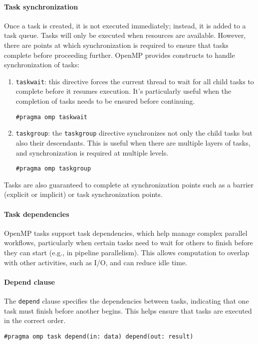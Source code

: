 \paragraph*{Task synchronization}
Once a task is created, it is not executed immediately; instead, it is added to a task queue. 
Tasks will only be executed when resources are available. However, there are points at which synchronization is required to ensure that tasks complete before proceeding further.
OpenMP provides constructs to handle synchronization of tasks:
\begin{enumerate}
    \item \texttt{taskwait}: this directive forces the current thread to wait for all child tasks to complete before it resumes execution. 
        It's particularly useful when the completion of tasks needs to be ensured before continuing.
\begin{lstlisting}[style=C]
#pragma omp taskwait 
\end{lstlisting}
    \item \texttt{taskgroup}: the \texttt{taskgroup} directive synchronizes not only the child tasks but also their descendants. 
        This is useful when there are multiple layers of tasks, and synchronization is required at multiple levels.
\begin{lstlisting}[style=C]
#pragma omp taskgroup
\end{lstlisting}
\end{enumerate}
Tasks are also guaranteed to complete at synchronization points such as a barrier (explicit or implicit) or task synchronization points.

\paragraph*{Task dependencies}
OpenMP tasks support task dependencies, which help manage complex parallel workflows, particularly when certain tasks need to wait for others to finish before they can start (e.g., in pipeline parallelism). 
This allows computation to overlap with other activities, such as I/O, and can reduce idle time.


\paragraph*{Depend clause}
The \texttt{depend} clause specifies the dependencies between tasks, indicating that one task must finish before another begins. 
This helps ensure that tasks are executed in the correct order.
\begin{lstlisting}[style=C]
#pragma omp task depend(in: data) depend(out: result)
\end{lstlisting}


